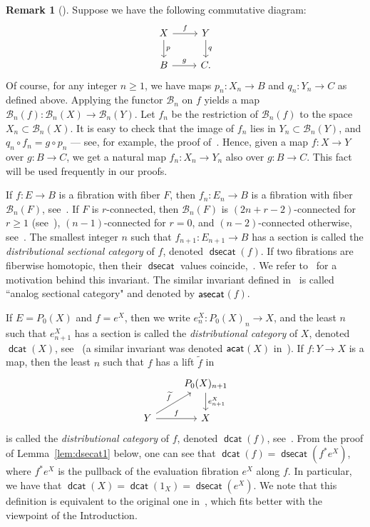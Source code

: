 \documentclass[amscd,amssymb,verbatim,11pt]{amsart}
\theoremstyle{plain}
\theoremstyle{definition}
\newtheorem{remark}[thm]{Remark}
\DeclareMathOperator{\dsecat}{{\mathsf{dsecat}}}
\DeclareMathOperator{\dcat}{{\mathsf{dcat}}}
\def\scr{\mathcal}
\def\B{{\scr B}}
\begin{document}
\begin{remark}[]\label{rem:naturality}
    Suppose we have the following commutative diagram:
\[
\begin{tikzcd}
    X \arrow{r}{f}  \arrow{d}{p}
    &
    Y \arrow{d}{q}
    \\
    B \arrow{r}{g}
    &
    C.
\end{tikzcd}
\]
Of course, for any integer $n\ge 1$, we have maps $p_n\colon X_n\to B$ and $q_n\colon Y_n\to C$ as defined above. Applying the functor $\B_n$ on $f$ yields a map $\B_n(f)\colon \B_n(X)\to \B_n(Y)$. Let $f_n$ be the restriction of $\B_n(f)$ to the space $X_n\subset \B_n(X)$. It is easy to check that the image of $f_n$ lies in $Y_n\subset \B_n(Y)$, and $q_n\circ f_n=g\circ p_n$ --- see, for example, the proof of~\cite[Proposition~5.3]{Ja1}. Hence, given a map $f\colon X\to Y$ over $g\colon B\to C$, we get a natural map $f_n\colon X_n\to Y_n$ also over $g\colon B\to C$. This fact will be used frequently in our proofs.
\end{remark}

If $f\colon E\to B$ is a fibration with fiber $F$, then $f_n\colon E_n \to B$ is a fibration with fiber $\B_n(F)$, see~\cite{DJ,KW}. If $F$ is $r$-connected, then $\B_n(F)$ is $(2n+r-2)$-connected for $r\ge 1$ (see~\cite{KK}), $(n-1)$-connected for $r=0$, and $(n-2)$-connected otherwise, see~\cite[Section 3]{Dr}. The smallest integer $n$ such that $f_{n+1}\colon E_{n+1}\to B$ has a section is called the \emph{distributional sectional category} of $f$, denoted $\dsecat(f)$. If two fibrations are fiberwise homotopic, then their $\dsecat$ values coincide,~\cite{Ja1}. We refer to~\cite[Section 2.1]{Ja2} for a motivation behind this invariant. The similar invariant defined in~\cite{KW} is called 
``analog sectional category" and denoted by $\sf{{asecat}}$$(f)$. 

If $E = P_0(X)$ and $f=e^X$, then we write
$e_n^X \colon P_0(X)_n \to X$, and the least $n$ such that $e_{n+1}^X$ has a section is called the \emph{distributional category} of $X$, denoted $\dcat(X)$, see~\cite{DJ} (a similar invariant was denoted $\sf{{acat}}$$(X)$ in~\cite{KW}). If $f\colon Y \to X$
is a map, then the least $n$ such that $f$ has a lift $\widetilde f$ in
\[
\begin{tikzcd}[contains/.style = {draw=none,"\in" description,sloped}]
&
P_0(X)_{n+1} \arrow{d}{e_{n+1}^X}
\\
Y  \arrow{r}{f} \arrow{ur}{\widetilde{f}}
&
X
\end{tikzcd}
\]
is called the \emph{distributional category} of $f$, denoted $\dcat(f)$, see~\cite{Dr,Ja2}. From the proof of Lemma~\ref{lem:dsecat1} below, one can see that $\dcat(f)=\dsecat(f^*e^X)$, where $f^*e^X$ is the pullback of the evaluation fibration $e^X$ along $f$. In particular, we have that $\dcat(X)=\dcat(1_X)=\dsecat(e^X)$.
We note that this definition is equivalent to the original one in~\cite{DJ}, which fits better with the viewpoint of the Introduction.
\end{document}

